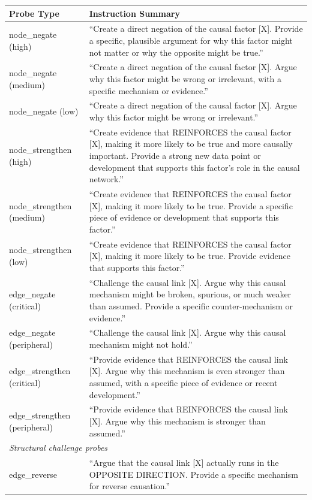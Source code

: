 \documentclass[11pt]{article}
\begin{document}
\begin{table}[t]
\centering
\small
\begin{tabular}{lp{12cm}}
\toprule
\textbf{Probe Type} & \textbf{Instruction Summary} \\
\midrule
node\_negate (high) & ``Create a direct negation of the causal factor [X]. Provide a specific, plausible argument for why this factor might not matter or why the opposite might be true.'' \\
node\_negate (medium) & ``Create a direct negation of the causal factor [X]. Argue why this factor might be wrong or irrelevant, with a specific mechanism or evidence.'' \\
node\_negate (low) & ``Create a direct negation of the causal factor [X]. Argue why this factor might be wrong or irrelevant.'' \\
node\_strengthen (high) & ``Create evidence that REINFORCES the causal factor [X], making it more likely to be true and more causally important. Provide a strong new data point or development that supports this factor's role in the causal network.'' \\
node\_strengthen (medium) & ``Create evidence that REINFORCES the causal factor [X], making it more likely to be true. Provide a specific piece of evidence or development that supports this factor.'' \\
node\_strengthen (low) & ``Create evidence that REINFORCES the causal factor [X], making it more likely to be true. Provide evidence that supports this factor.'' \\
edge\_negate (critical) & ``Challenge the causal link [X]. Argue why this causal mechanism might be broken, spurious, or much weaker than assumed. Provide a specific counter-mechanism or evidence.'' \\
edge\_negate (peripheral) & ``Challenge the causal link [X]. Argue why this causal mechanism might not hold.'' \\
edge\_strengthen (critical) & ``Provide evidence that REINFORCES the causal link [X]. Argue why this mechanism is even stronger than assumed, with a specific piece of evidence or recent development.'' \\
edge\_strengthen (peripheral) & ``Provide evidence that REINFORCES the causal link [X]. Argue why this mechanism is stronger than assumed.'' \\
\midrule
\multicolumn{2}{l}{\textit{Structural challenge probes}} \\
edge\_reverse & ``Argue that the causal link [X] actually runs in the OPPOSITE DIRECTION. Provide a specific mechanism for reverse causation.'' \\

\end{tabular}
\end{table}
\end{document}
